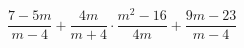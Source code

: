 \begin{ex}[type=expression]
	\begin{condition}
		\( \dfrac{7-5m}{m-4}+\dfrac{4m}{m+4} \cdot\dfrac{m^2-16}{4m}+\dfrac{9m-23}{m-4}\)
	\end{condition}
\end{ex}